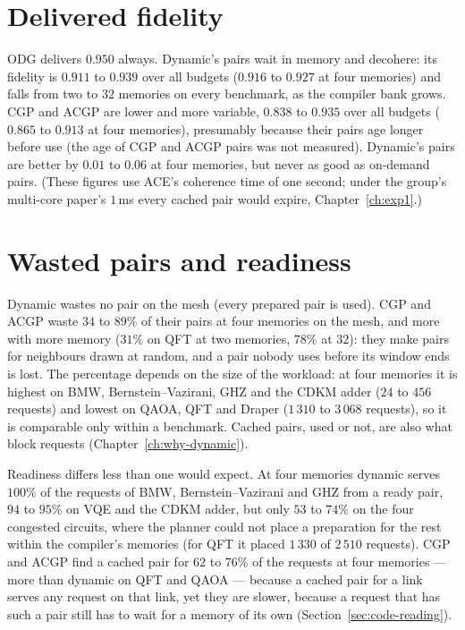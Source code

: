 \section{Delivered fidelity}


ODG delivers $0.950$ always. Dynamic's pairs wait in memory and decohere: its fidelity is $0.911$ to $0.939$ over all budgets ($0.916$ to $0.927$ at four memories) and falls from two to $32$ memories on every benchmark, as the compiler bank grows. CGP and ACGP are lower and more
variable, $0.838$ to $0.935$ over all budgets ($0.865$ to $0.913$ at four memories), presumably because their pairs age longer before use (the age of CGP and ACGP pairs was not measured). Dynamic's pairs are
better by $0.01$ to $0.06$ at four memories, but never as good as on-demand pairs. (These figures use ACE's coherence time of one second; under the group's multi-core paper's $1$\,ms every cached pair would expire, Chapter~\ref{ch:exp1}.)

\section{Wasted pairs and readiness}


Dynamic wastes no pair on the mesh (every prepared pair is used). CGP and ACGP waste $34$ to $89\%$ of their pairs at four memories on the mesh, and more with more memory
($31\%$ on QFT at two memories, $78\%$ at $32$): they make pairs for neighbours drawn at random, and a pair nobody uses before its window ends is lost. The percentage depends on the size of the workload: at four memories it is highest on BMW, Bernstein--Vazirani, GHZ
and the CDKM adder ($24$ to $456$ requests) and lowest on QAOA, QFT and Draper ($1\,310$ to $3\,068$ requests), so it is comparable only within a benchmark. Cached pairs, used or not, are also what block requests (Chapter~\ref{ch:why-dynamic}).

Readiness differs less than one would expect. At four memories dynamic serves $100\%$ of the requests of BMW, Bernstein--Vazirani and GHZ from a ready pair, $94$ to $95\%$ on VQE and the CDKM adder, but only $53$ to $74\%$ on the four congested circuits,
where the planner could not place a preparation for the rest within the compiler's memories (for QFT it placed $1\,330$ of $2\,510$ requests). CGP and ACGP find a cached pair for $62$ to $76\%$ of the requests at four memories --- more than dynamic on QFT and QAOA --- because a cached pair for a link serves any request
on that link, yet they are slower, because a request that has such a pair still has to wait for a memory of its own (Section~\ref{sec:code-reading}).

